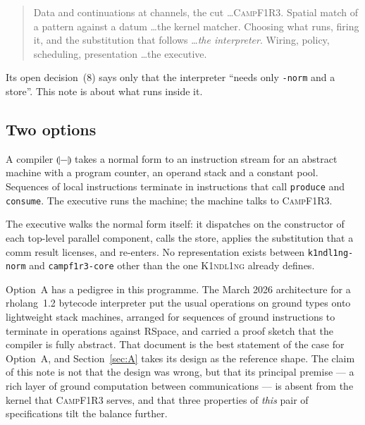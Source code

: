 \documentclass[11pt,a4paper]{article}
\newcommand{\code}[1]{\texttt{#1}}
\newcommand{\Kind}{\textsc{K1ndl1ng}}
\newcommand{\Camp}{\textsc{CampF1R3}}
\newcommand{\cmp}[1]{\llparenthesis #1 \rrparenthesis}
\theoremstyle{definition}
\theoremstyle{plain}
\begin{document}
\begin{quote}\small
Data and continuations at channels, the cut \dots \Camp. Spatial match of a
pattern against a datum \dots the kernel matcher. Choosing what runs, firing
it, and the substitution that follows \dots \emph{the interpreter}. Wiring,
policy, scheduling, presentation \dots the executive.
\end{quote}

\noindent
Its open decision~(8) says only that the interpreter ``needs only \code{-norm}
and a store''. This note is about what runs inside it.

\subsection{Two options}

\begin{description}[leftmargin=2.4em,style=nextline]
\item[Option~A --- the bytecode machine.] A compiler $\cmp{-}$ takes a normal
form to an instruction stream for an abstract machine with a program counter, an
operand stack and a constant pool. Sequences of local instructions terminate in
instructions that call \code{produce} and \code{consume}. The executive runs the
machine; the machine talks to \Camp.

\item[Option~B --- direct interpretation.] The executive walks the normal form
itself: it dispatches on the constructor of each top-level parallel component,
calls the store, applies the substitution that a comm result licenses, and
re-enters. No representation exists between \code{k1ndl1ng-norm} and
\code{campf1r3-core} other than the one \Kind{} already defines.
\end{description}

\noindent
Option~A has a pedigree in this programme. The March 2026 architecture for a
rholang~1.2 bytecode interpreter put the usual operations on ground types onto
lightweight stack machines, arranged for sequences of ground instructions to
terminate in operations against RSpace, and carried a proof sketch that the
compiler is fully abstract. That document is the best statement of the case for
Option~A, and Section~\ref{sec:A} takes its design as the reference shape.
The claim of this note is not that the design was wrong, but that its principal
premise --- a rich layer of ground computation between communications --- is
absent from the kernel that \Camp{} serves, and that three properties of
\emph{this} pair of specifications tilt the balance further.
\end{document}
